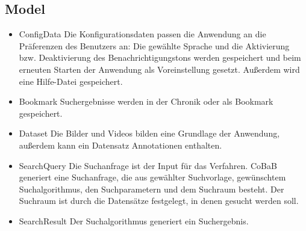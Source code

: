 \subsection*{Model}
\begin{itemize}
\item ConfigData \newline
Die Konfigurationsdaten passen die Anwendung an die Präferenzen des Benutzers an: Die gewählte Sprache und die Aktivierung bzw. Deaktivierung des Benachrichtigungstons werden gespeichert und beim erneuten Starten der Anwendung als Voreinstellung gesetzt. Außerdem wird eine Hilfe-Datei gespeichert.
\item Bookmark \newline
Suchergebnisse werden in der Chronik oder als Bookmark gespeichert.
\item Dataset \newline
Die Bilder und Videos bilden eine Grundlage der Anwendung, außerdem kann ein Datensatz  {Annotationen} enthalten.
\item SearchQuery \newline
Die Suchanfrage ist der Input für das Verfahren. CoBaB generiert eine Suchanfrage, die aus gewählter Suchvorlage, gewünschtem \gls{Suchalgorithmus}, den Suchparametern und dem Suchraum besteht. Der Suchraum ist durch die Datensätze festgelegt, in denen gesucht werden soll.
\item SearchResult \newline
Der \gls{Suchalgorithmus} generiert ein Suchergebnis.
\end{itemize}

